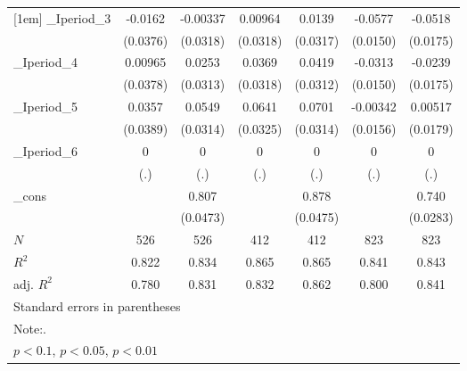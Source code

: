 \begin{table}[htbp]
\begin{tabular}{l*{6}{c}}
[1em]
\_Iperiod\_3&  -0.0162         & -0.00337         &  0.00964         &   0.0139         &  -0.0577\sym{***}&  -0.0518\sym{***}\\
          & (0.0376)         & (0.0318)         & (0.0318)         & (0.0317)         & (0.0150)         & (0.0175)         \\
[1em]
\_Iperiod\_4&  0.00965         &   0.0253         &   0.0369         &   0.0419         &  -0.0313\sym{**} &  -0.0239         \\
          & (0.0378)         & (0.0313)         & (0.0318)         & (0.0312)         & (0.0150)         & (0.0175)         \\
[1em]
\_Iperiod\_5&   0.0357         &   0.0549\sym{*}  &   0.0641\sym{*}  &   0.0701\sym{**} & -0.00342         &  0.00517         \\
          & (0.0389)         & (0.0314)         & (0.0325)         & (0.0314)         & (0.0156)         & (0.0179)         \\
[1em]
\_Iperiod\_6&        0         &        0         &        0         &        0         &        0         &        0         \\
          &      (.)         &      (.)         &      (.)         &      (.)         &      (.)         &      (.)         \\
[1em]
\_cons    &                  &    0.807\sym{***}&                  &    0.878\sym{***}&                  &    0.740\sym{***}\\
          &                  & (0.0473)         &                  & (0.0475)         &                  & (0.0283)         \\
\hline
\(N\)     &      526         &      526         &      412         &      412         &      823         &      823         \\
\(R^{2}\) &    0.822         &    0.834         &    0.865         &    0.865         &    0.841         &    0.843         \\
adj. \(R^{2}\)&    0.780         &    0.831         &    0.832         &    0.862         &    0.800         &    0.841         \\
\hline\hline
\multicolumn{7}{l}{\footnotesize Standard errors in parentheses}\\
\multicolumn{7}{l}{\footnotesize Note:.}\\
\multicolumn{7}{l}{\footnotesize \sym{*} \(p<0.1\), \sym{**} \(p<0.05\), \sym{***} \(p<0.01\)}\\
\end{tabular}
\end{table}
